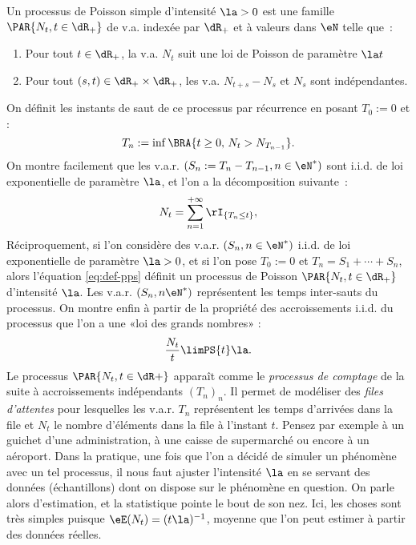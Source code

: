 Un processus de Poisson simple d'intensité $\la>0$ est une famille
$\PAR{N_t,t\in\dR_+}$ de v.a. indexée par $\dR_+$ et à valeurs dans $\eN$
telle que~:
\begin{enumerate}
\item Pour tout $t\in\dR_+$, la v.a. $N_t$ suit une loi de Poisson de paramètre
  $\la t$
\item Pour tout $(s,t)\in\dR_+\times\dR_+$, les v.a. $N_{t+s}-N_s$ et $N_s$ sont
  indépendantes.
\end{enumerate}
On définit les instants de saut de ce processus par récurrence en posant
$T_0:=0$ et :
$$
T_n:=\inf\BRA{t\geq 0,\,N_t>N_{T_{n-1}}}.
$$
On montre facilement que les v.a.r. $(S_n:=T_n-T_{n-1},n\in\eN^*)$ sont i.i.d.
de loi exponentielle de paramètre $\la$, et l'on a la décomposition suivante~:
\begin{equation}\label{eq:def-pps}
N_t=\sum_{n=1}^{+\infty} \rI_{\{T_n \leq t\}},
\end{equation}
Réciproquement, si l'on considère des v.a.r. $(S_n,n\in\eN^*)$ i.i.d. de loi
exponentielle de paramètre $\la>0$, et si l'on pose $T_0:=0$ et
$T_n=S_1+\cdots+S_n$, alors l'équation \eqref{eq:def-pps} définit un processus de
Poisson $\PAR{N_t,t\in\dR_+}$ d'intensité $\la$.  Les v.a.r. $(S_n,n\eN^*)$
représentent les temps inter-sauts du processus. On montre enfin à partir de
la propriété des accroissements i.i.d. du processus que l'on a une «loi des
grands nombres» :
\begin{equation}
\frac{N_t}{t} \limPS{t} \la.\label{eq:LGN-ppoiss}
\end{equation}
Le processus $\PAR{N_t,t\in\dR+}$ apparaît comme le \emph{processus de comptage}
de la suite à accroissements indépendants $(T_n)_n$. Il permet de modéliser
des \emph{files d'attentes} pour lesquelles les v.a.r. $T_n$ représentent les
temps d'arrivées dans la file et $N_t$ le nombre d'éléments dans la file à
l'instant $t$. Pensez par exemple à un guichet d'une administration, à une
caisse de supermarché ou encore à un aéroport. Dans la pratique, une fois que
l'on a décidé de simuler un phénomène avec un tel processus, il nous faut
ajuster l'intensité $\la$ en se servant des données (échantillons) dont on
dispose sur le phénomène en question. On parle alors d'estimation, et la
statistique pointe le bout de son nez. Ici, les choses sont très simples
puisque $\eE(N_t)=(t\la)^{-1}$, moyenne que l'on peut estimer à partir des
données réelles.

